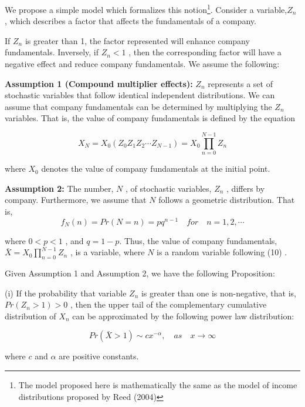 \documentclass[10pt,a4paper]{article}
\begin{document}
We propose a simple model which formalizes this notion\footnote{The model proposed here is mathematically the same as the model of income distributions proposed by Reed (2004)}.  Consider a variable,$Z_{n}$  , which describes a factor that affects the fundamentals of a company. 

If  $Z_{n}$  is greater than 1, the factor represented will enhance company fundamentals. Inversely, if $Z_{n}<1$ , then the corresponding factor will have a negative effect and reduce company fundamentals. We assume the following: 

\textbf{Assumption 1 (Compound multiplier effects):} $Z_{n}$  represents a set of stochastic variables that follow identical independent distributions. We can assume that company fundamentals can be determined by multiplying the $Z_{n}$ variables. That is, the value of company fundamentals is defined by the equation

\begin{equation}
X_{N}=X_{0}(Z_{0}Z_{1}Z_{2} \cdots Z_{N-1})=X_{0}\prod^{N-1}_{n=0}Z_{n}
\end{equation}

where  $X_{0}$ denotes the value of company fundamentals at the initial point. 

\textbf{Assumption 2:} The number, $N$ , of stochastic variables, $Z_{n}$ , differs by company. Furthermore, we assume that   $N$ follows a geometric distribution. That is, 
\begin{equation}
f_{N}(n)=Pr(N=n)=pq^{n-1} \quad for \quad  n=1,2,\cdots
\end{equation}

where $0<p<1$ , and  $q=1-p$.  Thus, the value of company fundamentals,$\bar{X}=X_{0}\prod^{N-1}_{n=0}Z_{n}  $ , is a variable, where $N$  is a random variable following (10) .

Given Assumption 1 and Assumption 2, we have the following Proposition: 

(i) If the probability that variable $Z_{n}$  is greater than one is non-negative, that is, $Pr(Z_{n}>1)>0$  , then the upper tail of the complementary cumulative distribution of $X_{n}$  can be approximated by the following power law distribution: 

\begin{equation}
Pr(\bar{X}>1) \sim cx^{-\alpha}, \quad as \quad x \to \infty   
\end{equation}

where $c$ and  $\alpha$ are positive constants. 
\end{document}
